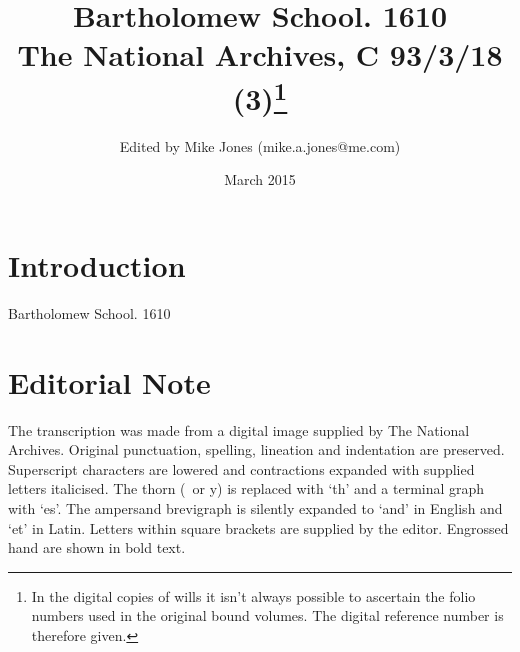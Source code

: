 \documentclass[a4paper,12pt]{article}
\makeatletter
\def\authorname{Mike Jones}
\def\authoremail{mike.a.jones@me.com}
\def\shorttitle{Bartholomew School. 1610}
\def\abstract{Bartholomew School. 1610}
\def\pubdate{March 2015}
\def\archivename{The National Archives}
\def\archiverefno{C 93/3/18 (3)}
\makeatother
\begin{document}
\title{\Large \shorttitle\\\normalsize \vspace{1em} \archivename \hspace{0 mm}, \archiverefno\footnote{In the digital copies of wills it isn't always possible to ascertain the folio numbers used in the original bound volumes. The digital reference number is therefore given.} \hspace{1 mm}}\vspace{-5em}
\author{\small Edited by \authorname \hspace{0 mm} (\authoremail)}
\date{\small \pubdate}
\maketitle

\section*{Introduction}

\abstract

\section*{Editorial Note}

The transcription was made from a digital image supplied by The National Archives. Original punctuation, spelling, lineation and indentation are preserved. Superscript characters are lowered and contractions expanded with supplied letters italicised. The thorn (\th\ or y) is replaced with `th' and a terminal graph with `es'. The ampersand brevigraph is silently expanded to `and' in English and `et' in Latin. Letters within square brackets are supplied by the editor. Engrossed hand are shown in bold text.
\end{document}

